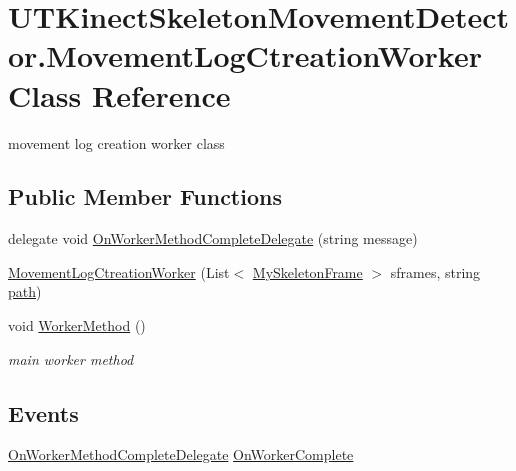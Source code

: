 \hypertarget{classUTKinectSkeletonMovementDetector_1_1MovementLogCtreationWorker}{\section{U\-T\-Kinect\-Skeleton\-Movement\-Detector.\-Movement\-Log\-Ctreation\-Worker Class Reference}
\label{classUTKinectSkeletonMovementDetector_1_1MovementLogCtreationWorker}
}


movement log creation worker class  


\subsection*{Public Member Functions}
\begin{DoxyCompactItemize}
\item 
delegate void \hyperlink{classUTKinectSkeletonMovementDetector_1_1MovementLogCtreationWorker_a812bd166505941b61f4c4d33345bd1f5}{On\-Worker\-Method\-Complete\-Delegate} (string message)
\item 
\hyperlink{classUTKinectSkeletonMovementDetector_1_1MovementLogCtreationWorker_aff1e02f238a10168e4c24468911a37f0}{Movement\-Log\-Ctreation\-Worker} (List$<$ \hyperlink{classUTKinectSkeletonMovementDetector_1_1MySkeletonFrame}{My\-Skeleton\-Frame} $>$ sframes, string \hyperlink{classUTKinectSkeletonMovementDetector_1_1MovementLogCtreationWorker_ab8603c7df27474a6cac515572ffc2c92}{path})
\item 
void \hyperlink{classUTKinectSkeletonMovementDetector_1_1MovementLogCtreationWorker_a22e7b14a025767fd5bbe00e5e921fbb1}{Worker\-Method} ()
\begin{DoxyCompactList}\small\item\em main worker method \end{DoxyCompactList}\end{DoxyCompactItemize}
\subsection*{Events}
\begin{DoxyCompactItemize}
\item 
\hyperlink{classUTKinectSkeletonMovementDetector_1_1MovementLogCtreationWorker_a812bd166505941b61f4c4d33345bd1f5}{On\-Worker\-Method\-Complete\-Delegate} \hyperlink{classUTKinectSkeletonMovementDetector_1_1MovementLogCtreationWorker_a9602a7bd07fa4db7c977303e6b25e4ec}{On\-Worker\-Complete}
\end{DoxyCompactItemize}

